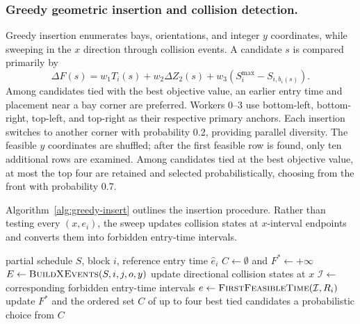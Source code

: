 \documentclass[runningheads]{llncs}
\begin{document}
\subsubsection{Greedy geometric insertion and collision detection.}
Greedy insertion enumerates bays, orientations, and integer $y$ coordinates, while sweeping in the $x$ direction through collision events. A candidate $s$ is compared primarily by
\begin{equation}
\Delta F(s)=w_1T_i(s)+w_2\Delta Z_2(s)
+w_3(S_i^{\max}-S_{i,b_i(s)}).
\end{equation}
Among candidates tied with the best objective value, an earlier entry time and placement near a bay corner are preferred. Workers 0--3 use bottom-left, bottom-right, top-left, and top-right as their respective primary anchors. Each insertion switches to another corner with probability 0.2, providing parallel diversity. The feasible $y$ coordinates are shuffled; after the first feasible row is found, only ten additional rows are examined. Among candidates tied at the best objective value, at most the top four are retained and selected probabilistically, choosing from the front with probability 0.7.

Algorithm~\ref{alg:greedy-insert} outlines the insertion procedure.  Rather
than testing every $(x,e_i)$, the sweep updates collision states at
$x$-interval endpoints and converts them into forbidden entry-time intervals.

\begin{algorithm}[t]
\caption{Greedy geometric insertion of block $i$}
\label{alg:greedy-insert}
\begin{algorithmic}[1]
\Require partial schedule $S$, block $i$, reference entry time $\hat e_i$
\State $C\gets\emptyset$ and $F^*\gets+\infty$
    \State $E\gets\Call{BuildXEvents}{S,i,j,o,y}$
        \State update directional collision states at $x$
        \State $\mathcal{I}\gets$ corresponding forbidden entry-time intervals
        \State $e\gets\Call{FirstFeasibleTime}{\mathcal{I},R_i}$
            \State update $F^*$ and the ordered set $C$ of up to four best tied candidates
        \EndIf
    \EndFor
  \EndFor
\EndFor
\State \Return a probabilistic choice from $C$
\end{algorithmic}
\end{algorithm}
\end{document}
